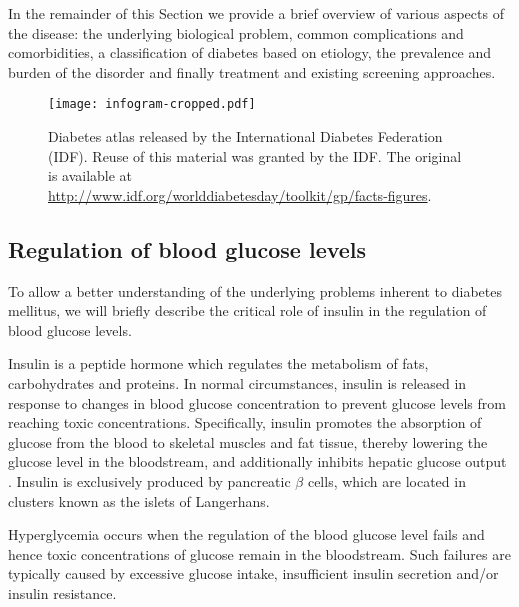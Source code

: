 In the remainder of this Section we provide a brief overview of various aspects of the disease: the underlying biological problem, common complications and comorbidities, a classification of diabetes based on etiology, the prevalence and burden of the disorder and finally treatment and existing screening approaches.

\begin{figure}[p]
  \centering
  \texttt{[image: infogram-cropped.pdf]}
  \caption{Diabetes atlas released by the International Diabetes Federation (IDF). Reuse of this material was granted by the IDF. The original is available at \url{http://www.idf.org/worlddiabetesday/toolkit/gp/facts-figures}.} 
  \label{intro:diabetes-infogram}
\end{figure}



\subsection{Regulation of blood glucose levels}
To allow a better understanding of the underlying problems inherent to diabetes mellitus, we will briefly describe the critical role of insulin in the regulation of blood glucose levels.

Insulin is a peptide hormone which regulates the metabolism of fats, carbohydrates and proteins. In normal circumstances, insulin is released in response to changes in blood glucose concentration to prevent glucose levels from reaching toxic concentrations. Specifically, insulin promotes the absorption of glucose from the blood to skeletal muscles and fat tissue, thereby lowering the glucose level in the bloodstream, and additionally inhibits hepatic glucose output \citep{sonksen2000insulin}. Insulin is exclusively produced by pancreatic $\beta$ cells, which are located in clusters known as the islets of Langerhans. 

Hyperglycemia occurs when the regulation of the blood glucose level fails and hence toxic concentrations of glucose remain in the bloodstream. Such failures are typically caused by excessive glucose intake, insufficient insulin secretion and/or insulin resistance. 


